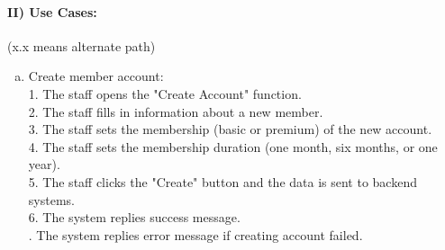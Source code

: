\documentclass[11pt]{article}
\begin{document}
\paragraph{II) Use Cases:}
(x.x means alternate path)
\begin{enumerate}[(a)]
\item Create member account:\\
1. The staff opens the "Create Account" function.\\
2. The staff fills in information about a new member.\\
3. The staff sets the membership (basic or premium) of the new account.\\
4. The staff sets the membership duration (one month, six months, or one year).\\
5. The staff clicks the "Create" button and the data is sent to backend systems.\\
6. The system replies success message.\\
. The system replies error message if creating account failed.

\end{enumerate}
\end{document}
